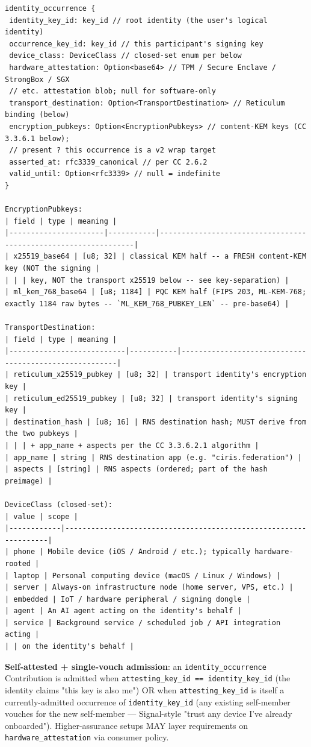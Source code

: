 \documentclass[11pt]{article}
\begin{document}
\begin{lstlisting}
identity_occurrence {
 identity_key_id: key_id // root identity (the user's logical identity)
 occurrence_key_id: key_id // this participant's signing key
 device_class: DeviceClass // closed-set enum per below
 hardware_attestation: Option<base64> // TPM / Secure Enclave / StrongBox / SGX
 // etc. attestation blob; null for software-only
 transport_destination: Option<TransportDestination> // Reticulum binding (below)
 encryption_pubkeys: Option<EncryptionPubkeys> // content-KEM keys (CC 3.3.6.1 below);
 // present ? this occurrence is a v2 wrap target
 asserted_at: rfc3339_canonical // per CC 2.6.2
 valid_until: Option<rfc3339> // null = indefinite
}

EncryptionPubkeys:
| field | type | meaning |
|----------------------|-----------|----------------------------------------------------------------|
| x25519_base64 | [u8; 32] | classical KEM half -- a FRESH content-KEM key (NOT the signing |
| | | key, NOT the transport x25519 below -- see key-separation) |
| ml_kem_768_base64 | [u8; 1184] | PQC KEM half (FIPS 203, ML-KEM-768; exactly 1184 raw bytes -- `ML_KEM_768_PUBKEY_LEN` -- pre-base64) |

TransportDestination:
| field | type | meaning |
|---------------------------|-----------|-------------------------------------------------------|
| reticulum_x25519_pubkey | [u8; 32] | transport identity's encryption key |
| reticulum_ed25519_pubkey | [u8; 32] | transport identity's signing key |
| destination_hash | [u8; 16] | RNS destination hash; MUST derive from the two pubkeys |
| | | + app_name + aspects per the CC 3.3.6.2.1 algorithm |
| app_name | string | RNS destination app (e.g. "ciris.federation") |
| aspects | [string] | RNS aspects (ordered; part of the hash preimage) |

DeviceClass (closed-set):
| value | scope |
|------------|------------------------------------------------------------------|
| phone | Mobile device (iOS / Android / etc.); typically hardware-rooted |
| laptop | Personal computing device (macOS / Linux / Windows) |
| server | Always-on infrastructure node (home server, VPS, etc.) |
| embedded | IoT / hardware peripheral / signing dongle |
| agent | An AI agent acting on the identity's behalf |
| service | Background service / scheduled job / API integration acting |
| | on the identity's behalf |
\end{lstlisting}

\textbf{Self-attested + single-vouch admission}: an \texttt{identity\_occurrence} Contribution is admitted when \texttt{attesting\_key\_id == identity\_key\_id} (the identity claims "this key is also me") OR when \texttt{attesting\_key\_id} is itself a currently-admitted occurrence of \texttt{identity\_key\_id} (any existing self-member vouches for the new self-member — Signal-style "trust any device I've already onboarded"). Higher-assurance setups MAY layer requirements on \texttt{hardware\_attestation} via consumer policy.
\end{document}

